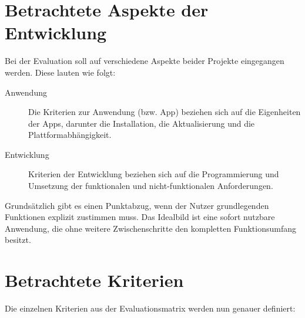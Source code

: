 \section{Betrachtete Aspekte der Entwicklung}
Bei der Evaluation soll auf verschiedene Aspekte beider Projekte eingegangen werden. Diese lauten wie folgt:
\begin{description}
	\item [Anwendung]
		Die Kriterien zur Anwendung (bzw. App) beziehen sich auf die Eigenheiten der Apps, darunter die Installation, die Aktualisierung und die Plattformabhängigkeit.
		
	\item [Entwicklung]
		Kriterien der Entwicklung beziehen sich auf die Programmierung und Umsetzung der funktionalen und nicht-funktionalen Anforderungen.
			
\end{description}


Grundsätzlich gibt es einen Punktabzug, wenn der Nutzer grundlegenden Funktionen explizit zustimmen muss. Das Idealbild ist eine sofort nutzbare Anwendung, die ohne weitere Zwischenschritte den kompletten Funktionsumfang besitzt.

\section{Betrachtete Kriterien}
Die einzelnen Kriterien aus der Evaluationsmatrix werden nun genauer definiert:

